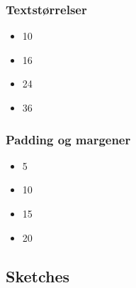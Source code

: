 \subsubsection*{Textstørrelser}

\begin{itemize}
    \item 10
    \item 16
    \item 24
    \item 36
\end{itemize}

\subsubsection*{Padding og margener}

\begin{itemize}
    \item 5
    \item 10
    \item 15
    \item 20
\end{itemize}

\subsection{Sketches}

